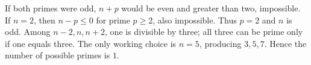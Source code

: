 If both primes were odd, $n+p$ would be even and greater than two, impossible. If $n=2$, then $n-p\le0$ for prime $p\ge2$, also impossible. Thus $p=2$ and $n$ is odd. Among $n-2,n,n+2$, one is divisible by three; all three can be prime only if one equals three. The only working choice is $n=5$, producing $3,5,7$. Hence the number of possible primes is $\boxed1$.
